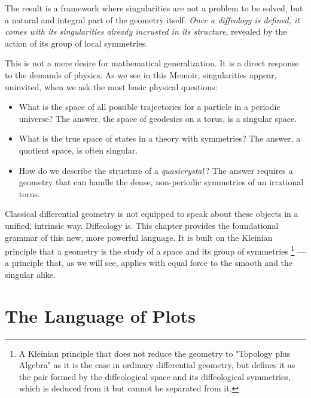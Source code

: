 \documentclass[10pt,reqno,letterpaper,twoside]{amsbook}
\begin{document}
  The result is a framework where singularities are not a problem to be solved,
  but a natural and integral part of the geometry itself.
  \emph{Once a diffeology is defined,
  it comes with its singularities already incrusted in its structure},
  revealed by the action of its group of local symmetries.
  
  This is not a mere desire for mathematical generalization.
  It is a direct response to the demands of physics.
  As we see in this Memoir,
  singularities appear,
  uninvited,
  when we ask the most basic physical questions:
  
  \begin{itemize}
    \item What is the space of all possible trajectories for a particle in a periodic universe?
    The answer,
    the space of geodesics on a torus,
    is a singular space.
    \item What is the true space of states in a theory with symmetries?
    The answer,
    a quotient space,
    is often singular.
    \item How do we describe the structure of a \emph{quasicrystal}\,?
    The answer requires a geometry that can handle the dense,
    non-periodic symmetries of an irrational torus.
  \end{itemize}
  
  Classical differential geometry is not equipped to speak about these objects in a unified,
  intrinsic way.
  Diffeology is.
  This chapter provides the foundational grammar of this new,
  more powerful language.
  It is built on the Kleinian principle that a geometry is the study of a space and its group of symmetries%
  \footnote{A Kleinian principle that does not reduce the geometry to "Topology plus Algebra" as it is the case in ordinary differential geometry,
  but defines it as the pair formed by the diffeological space and its diffeological symmetries,
  which is deduced from it but cannot be separated from it.}
  ---a principle that,
  as we will see,
  applies with equal force to the smooth and the singular alike.
  
  \section{The Language of Plots}
  \label{sec:The Language of Plots}
  
\end{document}
